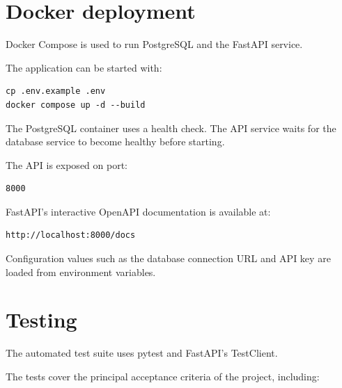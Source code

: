 \documentclass[11pt,a4paper]{article}
\begin{document}
\section{Docker deployment}

Docker Compose is used to run PostgreSQL and the FastAPI service.

The application can be started with:

\begin{verbatim}
cp .env.example .env
docker compose up -d --build
\end{verbatim}

The PostgreSQL container uses a health check. The API service waits for the
database service to become healthy before starting.

The API is exposed on port:

\begin{verbatim}
8000
\end{verbatim}

FastAPI's interactive OpenAPI documentation is available at:

\begin{verbatim}
http://localhost:8000/docs
\end{verbatim}

Configuration values such as the database connection URL and API key are
loaded from environment variables.

\section{Testing}

The automated test suite uses pytest and FastAPI's TestClient.

The tests cover the principal acceptance criteria of the project, including:
\end{document}
